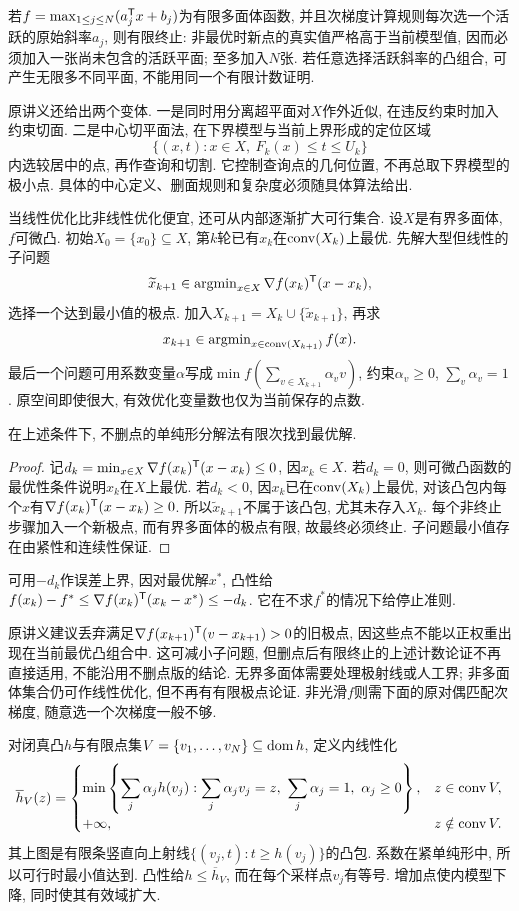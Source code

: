 若$f=\max_{1\le j\le N}(a_j^{\mathsf T} x+b_j)$为有限多面体函数, 并且次梯度计算规则每次选一个活跃的原始斜率$a_j$, 则有限终止: 非最优时新点的真实值严格高于当前模型值, 因而必须加入一张尚未包含的活跃平面; 至多加入$N$张. 若任意选择活跃斜率的凸组合, 可产生无限多不同平面, 不能用同一个有限计数证明.

原讲义还给出两个变体. 一是同时用分离超平面对$X$作外近似, 在违反约束时加入约束切面. 二是中心切平面法, 在下界模型与当前上界形成的定位区域
\[
 \{(x,t):x\in X,\ F_k(x)\le t\le U_k\}
\]
内选较居中的点, 再作查询和切割. 它控制查询点的几何位置, 不再总取下界模型的极小点. 具体的中心定义、删面规则和复杂度必须随具体算法给出.

当线性优化比非线性优化便宜, 还可从内部逐渐扩大可行集合. 设$X$是有界多面体, $f$可微凸. 初始$X_0=\{x_0\}\subseteq X$, 第$k$轮已有$x_k$在$\operatorname{conv}(X_k)$上最优. 先解大型但线性的子问题
\[
 \widetilde x_{k+1}\in\operatorname{argmin}_{x\in X}\nabla f(x_k)^{\mathsf T}(x-x_k),
\]
选择一个达到最小值的极点. 加入$X_{k+1}=X_k\cup\{\widetilde x_{k+1}\}$, 再求
\[
 x_{k+1}\in\operatorname{argmin}_{x\in\operatorname{conv}(X_{k+1})}f(x).
\]
最后一个问题可用系数变量$\alpha$写成$\min f(\sum_{v\in X_{k+1}}\alpha_vv)$, 约束$\alpha_v\ge0$, $\sum_v\alpha_v=1$. 原空间即使很大, 有效优化变量数也仅为当前保存的点数.

\begin{theorem}
在上述条件下, 不删点的单纯形分解法有限次找到最优解.
\end{theorem}
\begin{proof}
记$d_k=\min_{x\in X}\nabla f(x_k)^{\mathsf T}(x-x_k)\le0$, 因$x_k\in X$. 若$d_k=0$, 则可微凸函数的最优性条件说明$x_k$在$X$上最优. 若$d_k<0$, 因$x_k$已在$\operatorname{conv}(X_k)$上最优, 对该凸包内每个$x$有$\nabla f(x_k)^{\mathsf T}(x-x_k)\ge0$. 所以$\widetilde x_{k+1}$不属于该凸包, 尤其未存入$X_k$. 每个非终止步骤加入一个新极点, 而有界多面体的极点有限, 故最终必须终止. 子问题最小值存在由紧性和连续性保证.
\end{proof}

可用$-d_k$作误差上界, 因对最优解$x^*$, 凸性给$f(x_k)-f^*\le\nabla f(x_k)^{\mathsf T}(x_k-x^*)\le-d_k$. 它在不求$f^*$的情况下给停止准则.

原讲义建议丢弃满足$\nabla f(x_{k+1})^{\mathsf T}(v-x_{k+1})>0$的旧极点, 因这些点不能以正权重出现在当前最优凸组合中. 这可减小子问题, 但删点后有限终止的上述计数论证不再直接适用, 不能沿用不删点版的结论. 无界多面体需要处理极射线或人工界; 非多面体集合仍可作线性优化, 但不再有有限极点论证. 非光滑$f$则需下面的原对偶匹配次梯度, 随意选一个次梯度一般不够.

对闭真凸$h$与有限点集$V=\{v_1,\ldots,v_N\}\subseteq\operatorname{dom} h$, 定义内线性化
\begin{equation}\label{eq:inner-linearization}
 \overline h_V(z)=\begin{cases}
 \displaystyle\min\left\{\sum_j\alpha_jh(v_j):\sum_j\alpha_jv_j=z,\ \sum_j\alpha_j=1,\ \alpha_j\ge0\right\},&z\in\conv V,\\
 +\infty,&z\notin\conv V.
 \end{cases}
\end{equation}
其上图是有限条竖直向上射线$\{(v_j,t):t\ge h(v_j)\}$的凸包. 系数在紧单纯形中, 所以可行时最小值达到. 凸性给$h\le\overline h_V$, 而在每个采样点$v_j$有等号. 增加点使内模型下降, 同时使其有效域扩大.

